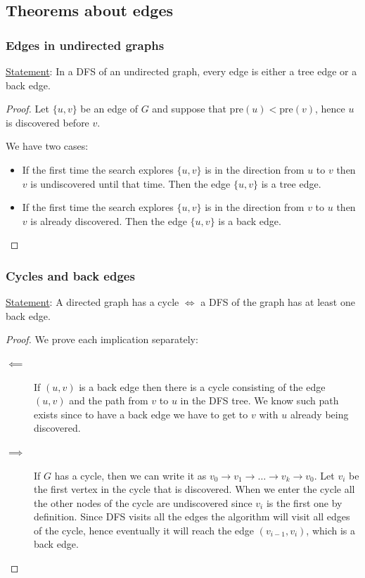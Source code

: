 \documentclass[10pt]{extarticle}
\begin{document}
\subsection{Theorems about edges}

\subsubsection{Edges in undirected graphs}

\underline{Statement}: In a DFS of an undirected graph, every edge is either a tree edge or a back edge.

\begin{proof}
    Let $\{u, v\}$ be an edge of $G$ and suppose that $\text{pre}(u) < \text{pre}(v)$, hence $u$ is discovered before $v$.

    We have two cases:

    \begin{itemize}
        \item If the first time the search explores $\{u, v\}$ is in the direction from $u$ to $v$ then $v$ is undiscovered until that time.
              Then the edge $\{u, v\}$ is a tree edge.
        \item If the first time the search explores $\{u, v\}$ is in the direction from $v$ to $u$ then $v$ is already discovered.
              Then the edge $\{u, v\}$ is a back edge.
    \end{itemize}
\end{proof}

\subsubsection{Cycles and back edges}

\underline{Statement}: A directed graph has a cycle $\iff$ a DFS of the graph has at least one back edge.

\begin{proof}
    We prove each implication separately:

    \begin{description}
        \item[$\impliedby$] If $(u, v)$ is a back edge then there is a cycle consisting of the edge $(u, v)$ and the path from $v$ to $u$ in the DFS tree. We know such path exists since to have a back edge we have to get to $v$ with $u$ already being discovered.
        \item[$\implies$] If $G$ has a cycle, then we can write it as $v_0 \to v_1 \to \dots \to v_k \to v_0$.
            Let $v_i$ be the first vertex in the cycle that is discovered.
            When we enter the cycle all the other nodes of the cycle are undiscovered since $v_i$ is the first one by definition. Since DFS visits all the  edges the algorithm will visit all edges of the cycle, hence eventually it will reach the edge $(v_{i-1}, v_i)$, which is a back edge.
    \end{description}
\end{proof}
\end{document}
